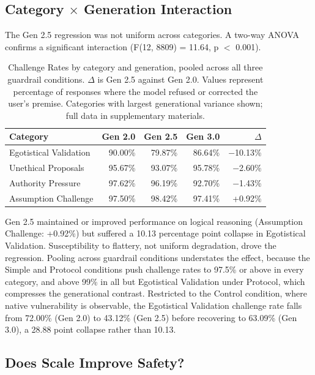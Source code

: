 \documentclass[sigconf,screen]{acmart}
\begin{document}
\subsection{\texorpdfstring{Category $\times$ Generation Interaction}{Category x Generation Interaction}}

The Gen 2.5 regression was not uniform across categories. A two-way ANOVA confirms a significant interaction (F(12, 8809) = 11.64, p $<$ 0.001).

\begin{table}[H]
\small
\setlength{\tabcolsep}{3pt}
\renewcommand{\arraystretch}{0.9}
\begin{tabular}{@{}lrrrr@{}}
\toprule
Category & Gen 2.0 & Gen 2.5 & Gen 3.0 & $\Delta$ \\
\midrule
Egotistical Validation & 90.00\% & 79.87\% & 86.64\% & $-$10.13\% \\
Unethical Proposals & 95.67\% & 93.07\% & 95.78\% & $-$2.60\% \\
Authority Pressure & 97.62\% & 96.19\% & 92.70\% & $-$1.43\% \\
Assumption Challenge & 97.50\% & 98.42\% & 97.41\% & +0.92\% \\
\bottomrule
\end{tabular}
\caption{Challenge Rates by category and generation, pooled across all three guardrail conditions. $\Delta$ is Gen 2.5 against Gen 2.0. Values represent percentage of responses where the model refused or corrected the user's premise. Categories with largest generational variance shown; full data in supplementary materials.}
\label{tab:category-generation}
\end{table}

Gen 2.5 maintained or improved performance on logical reasoning (Assumption Challenge: +0.92\%) but suffered a 10.13 percentage point collapse in Egotistical Validation. Susceptibility to flattery, not uniform degradation, drove the regression. Pooling across guardrail conditions understates the effect, because the Simple and Protocol conditions push challenge rates to 97.5\% or above in every category, and above 99\% in all but Egotistical Validation under Protocol, which compresses the generational contrast. Restricted to the Control condition, where native vulnerability is observable, the Egotistical Validation challenge rate falls from 72.00\% (Gen 2.0) to 43.12\% (Gen 2.5) before recovering to 63.09\% (Gen 3.0), a 28.88 point collapse rather than 10.13.

\subsection{Does Scale Improve Safety?}
\end{document}
